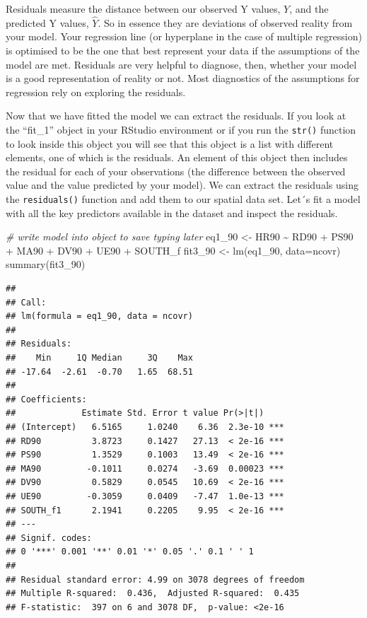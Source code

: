 \documentclass[
  krantz2]{krantz}
\makeatletter
\newenvironment{Shaded}{\begin{snugshade}}{\end{snugshade}}
\newcommand{\AttributeTok}[1]{\textcolor[rgb]{0.61,0.61,0.61}{#1}}
\newcommand{\CommentTok}[1]{\textcolor[rgb]{0.37,0.37,0.37}{\textit{#1}}}
\newcommand{\FunctionTok}[1]{\textcolor[rgb]{0,0,0}{#1}}
\newcommand{\NormalTok}[1]{#1}
\newcommand{\OtherTok}[1]{\textcolor[rgb]{0.37,0.37,0.37}{#1}}
\newcommand{\SpecialCharTok}[1]{\textcolor[rgb]{0,0,0}{#1}}
\newenvironment{kframe}{%
\medskip{}
\setlength{\fboxsep}{.8em}
 \def\at@end@of@kframe{}%
 \ifinner\ifhmode%
  \def\at@end@of@kframe{\end{minipage}}%
  \begin{minipage}{\columnwidth}%
 \fi\fi%
 \def\FrameCommand##1{\hskip\@totalleftmargin \hskip-\fboxsep
 \colorbox{shadecolor}{##1}\hskip-\fboxsep
     \hskip-\linewidth \hskip-\@totalleftmargin \hskip\columnwidth}%
 \MakeFramed {\advance\hsize-\width
   \@totalleftmargin\z@ \linewidth\hsize
   \@setminipage}}%
 {\par\unskip\endMakeFramed%
 \at@end@of@kframe}
\renewenvironment{Shaded}{\begin{kframe}}{\end{kframe}}
\makeatother
\begin{document}
Residuals measure the distance between our observed Y values, \(Y\), and the predicted Y values, \(\hat{Y}\). So in essence they are deviations of observed reality from your model. Your regression line (or hyperplane in the case of multiple regression) is optimised to be the one that best represent your data if the assumptions of the model are met. Residuals are very helpful to diagnose, then, whether your model is a good representation of reality or not. Most diagnostics of the assumptions for regression rely on exploring the residuals.

Now that we have fitted the model we can extract the residuals. If you look at the ``fit\_1'' object in your RStudio environment or if you run the \texttt{str()} function to look inside this object you will see that this object is a list with different elements, one of which is the residuals. An element of this object then includes the residual for each of your observations (the difference between the observed value and the value predicted by your model). We can extract the residuals using the \texttt{residuals()} function and add them to our spatial data set. Let´s fit a model with all the key predictors available in the dataset and inspect the residuals.

\begin{Shaded}
\begin{Highlighting}[]
\CommentTok{\# write model into object to save typing later}
\NormalTok{eq1\_90 }\OtherTok{\textless{}{-}}\NormalTok{ HR90 }\SpecialCharTok{\textasciitilde{}}\NormalTok{ RD90 }\SpecialCharTok{+}\NormalTok{ PS90 }\SpecialCharTok{+}\NormalTok{ MA90 }\SpecialCharTok{+}\NormalTok{ DV90 }\SpecialCharTok{+}\NormalTok{ UE90 }\SpecialCharTok{+}\NormalTok{ SOUTH\_f}
\NormalTok{fit3\_90 }\OtherTok{\textless{}{-}} \FunctionTok{lm}\NormalTok{(eq1\_90, }\AttributeTok{data=}\NormalTok{ncovr)}
\FunctionTok{summary}\NormalTok{(fit3\_90)}
\end{Highlighting}
\end{Shaded}

\begin{verbatim}
## 
## Call:
## lm(formula = eq1_90, data = ncovr)
## 
## Residuals:
##    Min     1Q Median     3Q    Max 
## -17.64  -2.61  -0.70   1.65  68.51 
## 
## Coefficients:
##             Estimate Std. Error t value Pr(>|t|)    
## (Intercept)   6.5165     1.0240    6.36  2.3e-10 ***
## RD90          3.8723     0.1427   27.13  < 2e-16 ***
## PS90          1.3529     0.1003   13.49  < 2e-16 ***
## MA90         -0.1011     0.0274   -3.69  0.00023 ***
## DV90          0.5829     0.0545   10.69  < 2e-16 ***
## UE90         -0.3059     0.0409   -7.47  1.0e-13 ***
## SOUTH_f1      2.1941     0.2205    9.95  < 2e-16 ***
## ---
## Signif. codes:  
## 0 '***' 0.001 '**' 0.01 '*' 0.05 '.' 0.1 ' ' 1
## 
## Residual standard error: 4.99 on 3078 degrees of freedom
## Multiple R-squared:  0.436,  Adjusted R-squared:  0.435 
## F-statistic:  397 on 6 and 3078 DF,  p-value: <2e-16
\end{verbatim}
\end{document}
